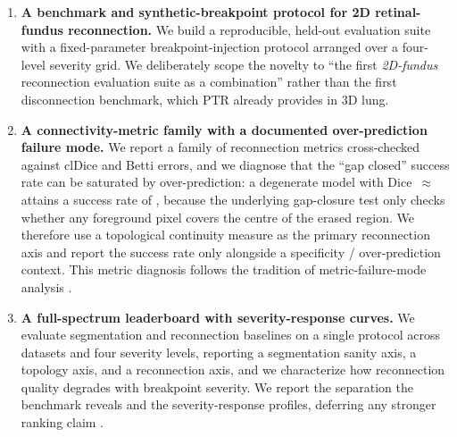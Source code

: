 \begin{enumerate}
  \item \textbf{A benchmark and synthetic-breakpoint protocol for 2D
        retinal-fundus reconnection.} We build a reproducible, held-out
        evaluation suite with a fixed-parameter breakpoint-injection
        protocol arranged over a four-level severity grid. We deliberately
        scope the novelty to ``the first \emph{2D-fundus} reconnection
        evaluation suite as a combination'' rather than the first
        disconnection benchmark, which PTR \cite{TODO_ptr} already provides
        in 3D lung.

  \item \textbf{A connectivity-metric family with a documented
        over-prediction failure mode.} We report a family of reconnection
        metrics cross-checked against clDice and Betti errors, and we
        diagnose that the ``gap closed'' success rate can be saturated by
        over-prediction: a degenerate model with Dice~$\approx$~
        attains a success rate of , because the underlying gap-closure
        test only checks whether any foreground pixel covers the centre of
        the erased region. We therefore use a topological continuity measure
        as the primary reconnection axis and report the success rate only
        alongside a specificity / over-prediction context. This metric
        diagnosis follows the tradition of metric-failure-mode analysis
        \cite{TODO_pixelwise,TODO_touchstone}.

  \item \textbf{A full-spectrum leaderboard with severity-response curves.}
        We evaluate  segmentation and reconnection baselines on a
        single protocol across datasets and four severity levels, reporting
        a segmentation sanity axis, a topology axis, and a reconnection axis,
        and we characterize how reconnection quality degrades with breakpoint
        severity. We report the separation the benchmark reveals and the
        severity-response profiles, deferring any stronger ranking claim
        .


\end{enumerate}

